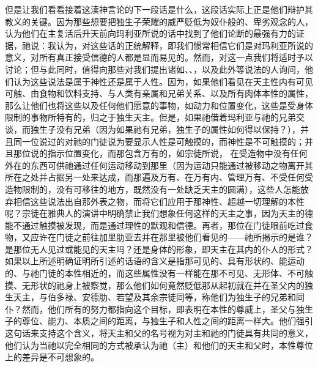 但是让我们看看接着这渎神言论的下一段话是什么，这段话实际上正是他们辩护其教义的关键。因为那些想要把独生子荣耀的威严贬低为奴仆般的、卑劣观念的人，认为他们在主复活后升天前向玛利亚所说的话中找到了他们论断的最强有力的证据，祂说：我认为，对这些话的正统解释，即我们惯常相信它们是对玛利亚所说的意义，对所有真正接受信德的人都是显而易见的。然而，对这一点我们将适时予以讨论；但与此同时，值得向那些对我们提出诸如、、，以及此外等说法的人询问，他们认为这些说法是属于神性还是属于人性。因为，如果他们看见在天主性内有可见可触、由食物和饮料支持、与人类有亲属和兄弟关系、以及所有肉体本性的属性，那么让他们也将这些以及任何他们愿意的事物，如动力和位置变化，这些是受身体限制的事物所特有的，归之于独生天主。但是，如果祂借着玛利亚与祂的兄弟交谈，而独生子没有兄弟（因为如果祂有兄弟，独生子的属性如何得以保持？），并且同一位说过的对祂的门徒说为要显示人性是可触摸的，而神性是不可触摸的；并且那位说的指示位置变化，而那包含万有的，如宗徒所说， 在受造物中没有任何外在的东西可供祂通过任何运动移动到那里（因为运动只能通过被移动之物离开其所在之处并占据另一处来达成，而那遍及万有、在万有内、管理万有、不受任何受造物限制的，没有可移往的地方，既然没有一处缺乏天主的圆满），这些人怎能放弃相信这些说法出自那外表之物，而将它们应用于那神性、超越一切理解的本性呢？宗徒在雅典人的演讲中明确禁止我们想象任何这样的天主之事，因为天主的德能不通过触摸被发现，而是通过理性的默观和信德。再者，那位在门徒眼前吃过食物，又应许在门徒之前往加里肋亚去并在那里被他们看见的——祂所揭示的是谁？是那位无人见过或能见的天主吗？还是身体的形象，即天主在其内的仆人的形式？如果以上所述明确证明所引述的话语的含义是指那可见的、具有形状的、能运动的、与祂门徒的本性相近的，而这些属性没有一样能在那不可见、无形体、不可触摸、无形状的祂身上被察觉，那么他们如何竟然贬低那从起初就在并在圣父内的独生天主，与伯多禄、安德肋、若望及其余宗徒同等，称他们为独生子的兄弟和同仆？然而，他们所有的努力都指向这个目标，即表明在本性的尊威上，圣父与独生子的尊位、能力、本质之间的距离，与独生子和人性之间的距离一样大。他们强引这句话来支持这个含义，将天主和父的名号视为对主和祂的门徒具有共同的意义，他们认为当祂以完全相同的方式被承认为祂（主）和他们的天主和父时，本性尊位上的差异是不可想象的。\par

